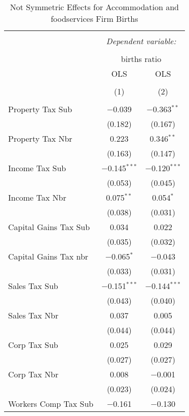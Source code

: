
\begin{table}[!htbp] \centering 
  \caption{Not Symmetric Effects for  Accommodation and foodservices Firm Births} 
  \label{72noequality} 
\begin{tabular}{@{\extracolsep{5pt}}lcc} 
\\[-1.8ex]\hline 
\hline \\[-1.8ex] 
 & \multicolumn{2}{c}{\textit{Dependent variable:}} \\ 
\cline{2-3} 
\\[-1.8ex] & \multicolumn{2}{c}{births ratio} \\ 
 & OLS & OLS \\ 
\\[-1.8ex] & (1) & (2)\\ 
\hline \\[-1.8ex] 
 Property Tax Sub & $-$0.039 & $-$0.363$^{**}$ \\ 
  & (0.182) & (0.167) \\ 
  Property Tax Nbr & 0.223 & 0.346$^{**}$ \\ 
  & (0.163) & (0.147) \\ 
  Income Tax Sub & $-$0.145$^{***}$ & $-$0.120$^{***}$ \\ 
  & (0.053) & (0.045) \\ 
  Income Tax Nbr & 0.075$^{**}$ & 0.054$^{*}$ \\ 
  & (0.038) & (0.031) \\ 
  Capital Gains Tax Sub & 0.034 & 0.022 \\ 
  & (0.035) & (0.032) \\ 
  Capital Gains Tax nbr & $-$0.065$^{*}$ & $-$0.043 \\ 
  & (0.033) & (0.031) \\ 
  Sales Tax Sub & $-$0.151$^{***}$ & $-$0.144$^{***}$ \\ 
  & (0.043) & (0.040) \\ 
  Sales Tax Nbr & 0.037 & 0.005 \\ 
  & (0.044) & (0.044) \\ 
  Corp Tax Sub & 0.025 & 0.029 \\ 
  & (0.027) & (0.027) \\ 
  Corp Tax Nbr & 0.008 & $-$0.001 \\ 
  & (0.023) & (0.024) \\ 
  Workers Comp Tax Sub & $-$0.161 & $-$0.130 \\ 

\end{tabular}
\end{table}
